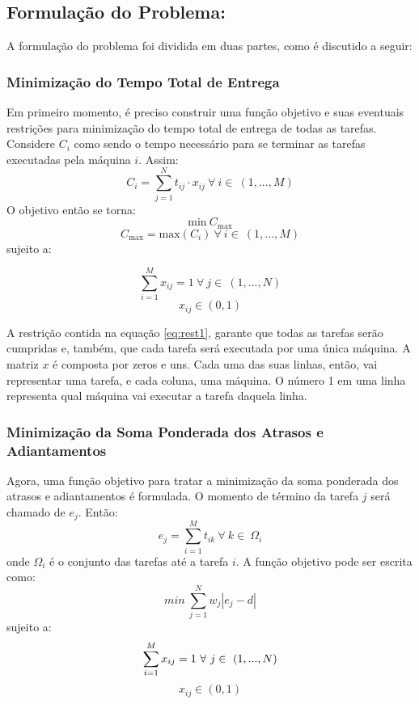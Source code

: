 \documentclass[conference]{IEEEtran}
\begin{document}
\subsection{Formulação do Problema:}
A formulação do problema foi dividida em duas partes, como é discutido a seguir:

\subsubsection{Minimização do Tempo Total de Entrega}
Em primeiro momento, é preciso construir uma função objetivo e suas eventuais restrições para minimização do tempo total de entrega de todas as tarefas. Considere $C_i$ como sendo o tempo necessário para se terminar as tarefas executadas pela máquina $i$. Assim:
\[C_i = \sum_{j=1}^{N}t_{ij} \cdot x_{ij}\ \forall\ i \in\ (1,...,M) \]
O objetivo então se torna:
\[\mathrm{min}\ C_{\mathrm{max}} \]
\[C_{\mathrm{max}} = \mathrm{max}(C_i)\ \forall\ i \in\ (1,...,M) \]
sujeito a:

\begin{equation}
	\sum_{i=1}^{M}x_{ij}=1\ \forall\ j \in\ (1,...,N)
	\label{eq:rest1}
\end{equation}
\[ x_{ij} \in (0, 1)\]

A restrição contida na equação \ref{eq:rest1}, garante que todas as tarefas serão cumpridas e, também, que cada tarefa será executada por uma única máquina. A matriz $x$ é composta por zeros e uns. Cada uma das suas linhas, então, vai representar uma tarefa, e cada coluna, uma máquina. O número 1 em uma linha representa qual máquina vai executar a tarefa daquela linha.

\subsubsection{Minimização da Soma Ponderada dos Atrasos e Adiantamentos}
Agora, uma função objetivo para tratar a minimização da soma ponderada dos atrasos e adiantamentos é formulada. O momento de término da tarefa $j$ será chamado de $e_j$. Então:
\[e_j = \sum_{i=1}^{M}t_{ik}\ \forall\ k \in\ \Omega_i \]
onde $\Omega_i$ é o conjunto das tarefas até a tarefa $i$. A função objetivo pode ser escrita como:
\[min\ \sum_{j=1}^{N}w_j|e_j-d| \]
sujeito a:
\begin{equation}
\sum_{i=1}^{M}x_{ij}=1\ \forall\ j \in\ (1,...,N)\\
\label{eq:rest3}
\end{equation}
\[x_{ij} \in (0, 1)\]
\end{document}
